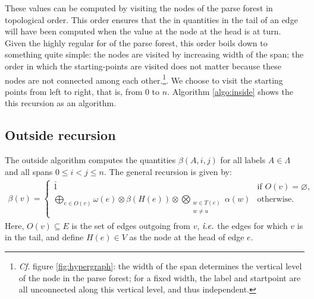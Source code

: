   These values can be computed by visiting the nodes of the parse forest in topological order. This order ensures that the in quantities in the tail of an edge will have been computed when the value at the node at the head is at turn. Given the highly regular for of the parse forest, this order boils down to something quite simple: the nodes are visited by increasing width of the span; the order in which the starting-points are visited does not matter because these nodes are not connected among each other.\footnote{\textit{Cf.} figure \ref{fig:hypergraph}: the width of the span determines the vertical level of the node in the parse forest; for a fixed width, the label and startpoint are all unconnected along this vertical level, and thus independent.}. We choose to visit the starting points from left to right, that is, from 0 to $n$. Algorithm \ref{algo:inside} shows the this recursion as an algorithm.


\subsection{Outside recursion}
  The outside algorithm computes the quantities $\beta(A,i,j)$ for all labels $A \in \Lambda$ and all spans $0 \leq i < j \leq n$. The general recursion is given by:
  \begin{align*}
    \beta(v) =
      \begin{cases}
        \bar{1}  & \mbox{if } O(v) = \varnothing, \\
        \displaystyle\bigoplus_{e \in O(v)} \omega(e) \otimes \beta(H(e)) \otimes \displaystyle\bigotimes_{ \substack{ w \in T(e) \\ w \neq u } } \alpha(w)  & \mbox{otherwise.}
      \end{cases}
  \end{align*}
  Here, $O(v) \subseteq E$ is the set of edges outgoing from $v$, $\emph{i.e.}$ the edges for which $v$ is in the tail, and define $H(e) \in V$ as the node at the head of edge $e$.


